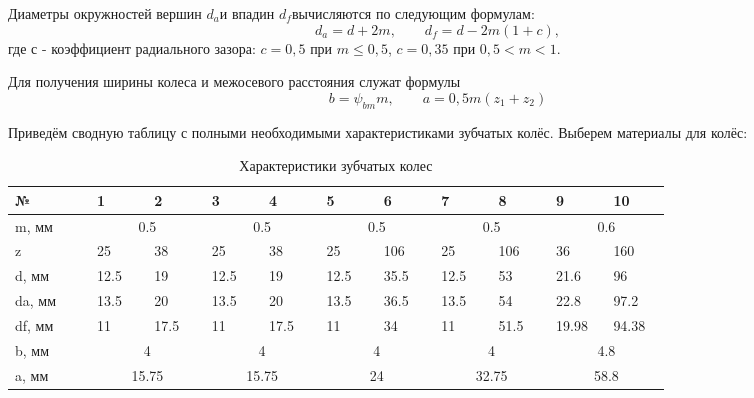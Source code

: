 \documentclass[14pt,a4paper,russian]{scrartcl}
\begin{document}
        Диаметры окружностей вершин \( d_a \)и впадин \( d_f \)вычисляются по следующим формулам:
        \[ d_a = d + 2m,\qquad d_f = d - 2m(1+c),\]
        где с - коэффициент радиального зазора: 
            \( c=0,5 \) при \( m\leq 0,5 \), \( c=0,35 \) при \( 0,5<m<1 \).
        
        Для получения ширины колеса и межосевого расстояния служат формулы
        \[ b=\psi_{bm}m, \qquad  a = 0,5m(z_1+z_2)\]
        
        Приведём сводную таблицу с полными необходимыми характеристиками зубчатых колёс.
        Выберем материалы для колёс:
        \begin{table}[h!]
            \begin{center}
                \begin{tabular}{p{0.1\linewidth}|p{0.07\linewidth}p{0.07\linewidth}p{0.07\linewidth}p{0.07\linewidth}p{0.07\linewidth}p{0.07\linewidth}p{0.07\linewidth}p{0.07\linewidth}p{0.07\linewidth}p{0.07\linewidth}}
                    \hline
                    №   & 1&2&3&4&5&6&7&8&9&10\\
                    \hline
                    m, мм  & \multicolumn{2}{c}{0.5} & \multicolumn{2}{c}{0.5} & \multicolumn{2}{c}{0.5} & \multicolumn{2}{c}{0.5} & \multicolumn{2}{c}{0.6} \\
                    z       & 25 &  38 &  25 &  38 &  25 & 106 &   25 &  106 &  36 &  160 \\
                    d, мм   & 12.5 &  19 &  12.5 &  19 &  12.5 & 35.5 &   12.5 &  53 &  21.6 &  96 \\
                    da, мм  & 13.5 & 20 & 13.5 & 20 & 13.5 & 36.5 & 13.5 & 54 & 22.8 & 97.2 \\
                    df, мм  & 11 & 17.5 & 11 & 17.5 & 11 & 34 & 11 & 51.5 & 19.98 & 94.38 \\
                    b, мм & \multicolumn{2}{c}{4} &  \multicolumn{2}{c}{4} &  \multicolumn{2}{c}{4} & \multicolumn{2}{c}{4} &\multicolumn{2}{c}{4.8} \\
                    a, мм & \multicolumn{2}{c}{15.75} & \multicolumn{2}{c}{15.75} & \multicolumn{2}{c}{24} & \multicolumn{2}{c}{32.75} & \multicolumn{2}{c}{58.8} \\
                    \hline
                \end{tabular}
                \caption{{Характеристики зубчатых колес}}\label{tab:gears_digest}
            \end{center}
        \end{table}
\end{document}
